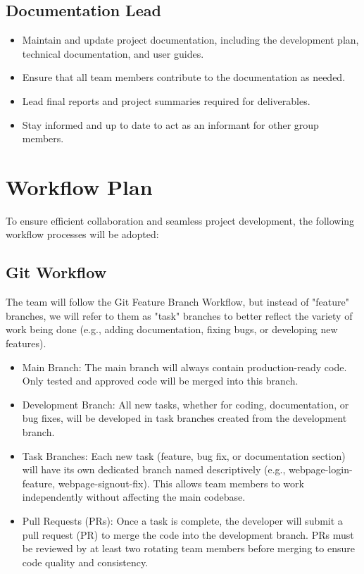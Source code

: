 \documentclass{article}
\begin{document}
\subsection{Documentation Lead}
  \begin{itemize}
    \item Maintain and update project documentation, including the development plan, technical documentation, and user guides.
    \item Ensure that all team members contribute to the documentation as needed.
    \item Lead final reports and project summaries required for deliverables.
    \item Stay informed and up to date to act as an informant for other group members.
  \end{itemize}
  

\section{Workflow Plan}

To ensure efficient collaboration and seamless project development, the following workflow processes will be adopted:

\subsection{Git Workflow}
The team will follow the Git Feature Branch Workflow, but instead of "feature" branches, we will refer to them as "task" branches to better reflect the variety of work being done (e.g., adding documentation, fixing bugs, or developing new features).

\begin{itemize}
    \item Main Branch: The main branch will always contain production-ready code. Only tested and approved code will be merged into this branch.
    \item Development Branch: All new tasks, whether for coding, documentation, or bug fixes, will be developed in task branches created from the development branch.
    \item Task Branches: Each new task (feature, bug fix, or documentation section) will have its own dedicated branch named descriptively (e.g., webpage-login-feature, webpage-signout-fix). This allows team members to work independently without affecting the main codebase.
    \item Pull Requests (PRs): Once a task is complete, the developer will submit a pull request (PR) to merge the code into the development branch. PRs must be reviewed by at least two rotating team members before merging to ensure code quality and consistency.
\end{itemize}
\end{document}
